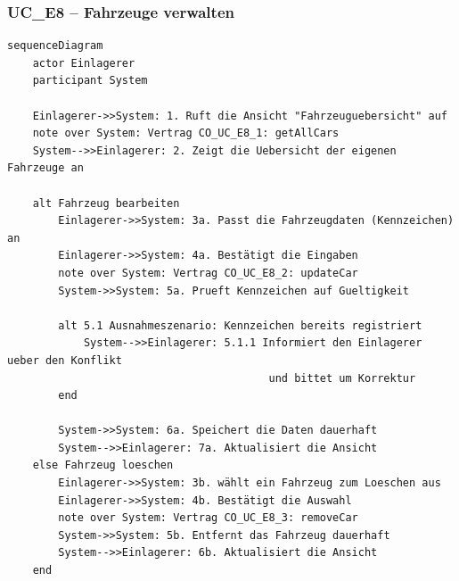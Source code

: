 \newpage

{}
\subsubsection*{UC\_E8 – Fahrzeuge verwalten}

\begin{lstlisting}[basicstyle=\ttfamily\small, breaklines=true]
sequenceDiagram
    actor Einlagerer
    participant System

    Einlagerer->>System: 1. Ruft die Ansicht "Fahrzeuguebersicht" auf
    note over System: Vertrag CO_UC_E8_1: getAllCars
    System-->>Einlagerer: 2. Zeigt die Uebersicht der eigenen Fahrzeuge an

    alt Fahrzeug bearbeiten
        Einlagerer->>System: 3a. Passt die Fahrzeugdaten (Kennzeichen) an
        Einlagerer->>System: 4a. Bestätigt die Eingaben
        note over System: Vertrag CO_UC_E8_2: updateCar
        System->>System: 5a. Prueft Kennzeichen auf Gueltigkeit

        alt 5.1 Ausnahmeszenario: Kennzeichen bereits registriert
            System-->>Einlagerer: 5.1.1 Informiert den Einlagerer ueber den Konflikt
                                         und bittet um Korrektur
        end

        System->>System: 6a. Speichert die Daten dauerhaft
        System-->>Einlagerer: 7a. Aktualisiert die Ansicht
    else Fahrzeug loeschen
        Einlagerer->>System: 3b. wählt ein Fahrzeug zum Loeschen aus
        Einlagerer->>System: 4b. Bestätigt die Auswahl
        note over System: Vertrag CO_UC_E8_3: removeCar
        System->>System: 5b. Entfernt das Fahrzeug dauerhaft
        System-->>Einlagerer: 6b. Aktualisiert die Ansicht
    end
\end{lstlisting}

\newpage




